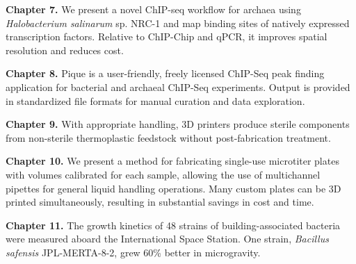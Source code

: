 

\noindent\textbf{Chapter 7.} We present a novel ChIP-seq workflow for archaea using {\em Halobacterium
salinarum} sp. NRC-1 and map binding sites of natively expressed transcription
factors. Relative to ChIP-Chip and qPCR, it improves spatial resolution and
reduces cost. %

\noindent\textbf{Chapter 8.} Pique is a user-friendly, freely licensed ChIP-Seq peak finding application
for bacterial and archaeal ChIP-Seq experiments. Output is provided in
standardized file formats for manual curation and data exploration. %


\noindent\textbf{Chapter 9.} With appropriate handling, 3D printers produce sterile
components from non-sterile thermoplastic feedstock without post-fabrication
treatment.

\noindent\textbf{Chapter 10.} We present a method for fabricating single-use microtiter plates with volumes
calibrated for each sample, allowing the use of multichannel pipettes for
general liquid handling operations. Many custom plates can be 3D printed
simultaneously, resulting in substantial savings in cost and time.


\noindent\textbf{Chapter 11.} The growth kinetics of 48 strains of building-associated
bacteria were measured aboard the International Space Station. One strain, {\em Bacillus safensis}
JPL-MERTA-8-2, grew 60\% better in microgravity.
